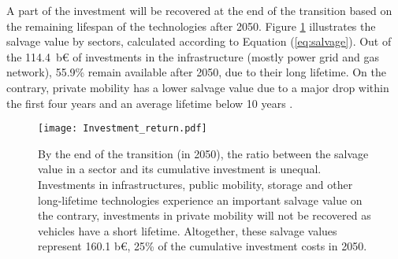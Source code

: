 
A part of the investment will be recovered at the end of the transition based on the remaining lifespan of the technologies after 2050. Figure \ref{fig:pestd_inv_return} illustrates the salvage value by sectors, calculated according to Equation (\ref{eq:salvage}). Out of the 114.4~b€ of investments in the infrastructure (\ie mostly power grid and gas network), 55.9\% remain available after 2050, due to their long lifetime. On the contrary, private mobility has a lower salvage value due to a major drop within the first four years and an average lifetime below 10 years \cite{febiac2021datadigest}. 


\begin{figure}[!htbp]
\centering
\texttt{[image: Investment\_return.pdf]}
\caption{By the end of the transition (\ie in 2050), the ratio between the salvage value in a sector and its cumulative investment is unequal. Investments in infrastructures, public mobility, storage and other long-lifetime technologies experience an important salvage value on the contrary, investments in private mobility will not be recovered as vehicles have a short lifetime. Altogether, these salvage values represent 160.1 b€, 25\% of the cumulative investment costs in 2050.}
\label{fig:pestd_inv_return}
\end{figure}

